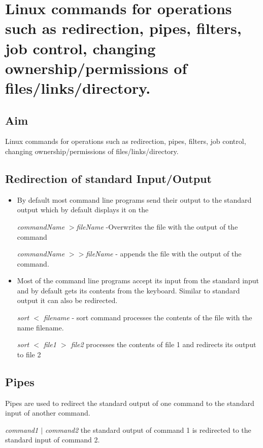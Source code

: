 \documentclass{article}
\begin{document}
\section{Linux commands for operations such as redirection, pipes, filters, job control, changing ownership/permissions of files/links/directory.}

\subsection{Aim}
Linux commands for operations such as redirection, pipes, filters, job control, changing ownership/permissions of files/links/directory.

\subsection{Redirection of standard Input/Output}
\begin{itemize}
\item By default most command line programs send their output to the standard output which by default displays it on the 

\hspace{10mm} \textit{commandName} $>$\textit{fileName} -Overwrites the file with the output of the command

\hspace{10mm} \textit{commandName} $>>$\textit{fileName} - appends the file with the output of the command.

\item Most of the command line programs accept its input from the standard input and by default gets its contents from the keyboard. Similar to standard output it can also be redirected.

\textit{sort $<$ filename} - sort command processes the contents of the file with the name filename.

\hspace{10mm} \textit{sort $<$ file1 $>$ file2} processes the contents of file 1 and redirects its output to file 2

\end{itemize}

\subsection{Pipes}
Pipes are used to redirect the standard output of one command to the standard input of another command.

\hspace{10mm} \textit{command1 $|$ command2} the standard output of command 1 is redirected to the standard input of command 2.
\end{document}
